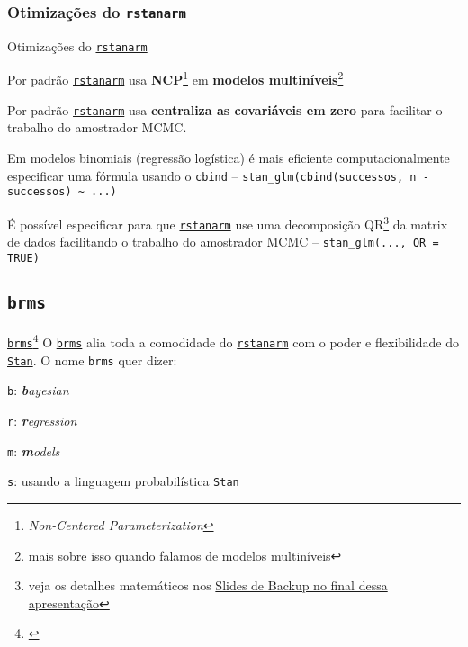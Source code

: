 \subsubsection{Otimizações do \texttt{rstanarm}}
\begin{frame}{Otimizações do \href{http://mc-stan.org/rstanarm/}{\texttt{rstanarm}}}
    \begin{vfilleditems}
        \item Por padrão \href{http://mc-stan.org/rstanarm/}{\texttt{rstanarm}}
        usa \textbf{NCP}\footnote{\textit{Non-Centered Parameterization}}
        em \textbf{modelos multiníveis}\footnote{mais sobre isso quando falamos de modelos multiníveis}
        \item Por padrão \href{http://mc-stan.org/rstanarm/}{\texttt{rstanarm}}
        usa \textbf{centraliza as covariáveis em zero} para facilitar o trabalho do amostrador
        MCMC.
        \item Em modelos binomiais (regressão logística) é mais eficiente computacionalmente
        especificar uma fórmula usando o \lstinline!cbind! --
        \lstinline!stan_glm(cbind(successos, n - successos) ~ ...)!
        \item É possível especificar para que \href{http://mc-stan.org/rstanarm/}{\texttt{rstanarm}}
        use uma decomposição QR\footnote{veja os detalhes matemáticos nos \hyperlink{appendixqr}{Slides de Backup no final dessa apresentação}}
        da matrix de dados facilitando o trabalho do amostrador MCMC
        -- \lstinline!stan_glm(..., QR = TRUE)!
    \end{vfilleditems}
\end{frame}

\subsection{\texttt{brms}}
\begin{frame}{\href{https://paul-buerkner.github.io/brms/}{\texttt{brms}}\footnote{\textcite{brms}}}
    O \href{https://paul-buerkner.github.io/brms/}{\texttt{brms}} alia toda a
    comodidade do \href{http://mc-stan.org/rstanarm/}{\texttt{rstanarm}} com o
    poder e flexibilidade do \href{https://mc-stan.org}{\texttt{Stan}}.
    O nome \texttt{brms} quer dizer:
    \begin{vfilleditems}
        \item \texttt{b}: \textit{\textbf{b}ayesian}
        \item \texttt{r}: \textit{\textbf{r}egression}
        \item \texttt{m}: \textit{\textbf{m}odels}
        \item \texttt{s}: usando a linguagem probabilística \texttt{Stan}
    \end{vfilleditems}
\end{frame}
